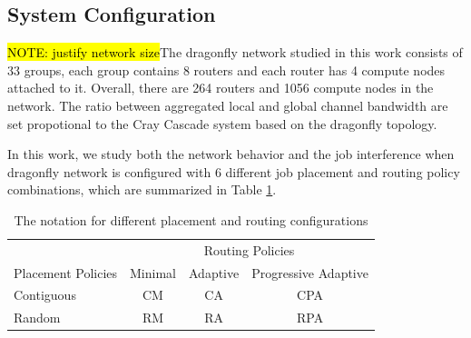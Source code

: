 \documentclass[conference,compsoc]{IEEEtran}
\newcommand{\NOTE}[1]{\hl {NOTE: #1}}
\begin{document}
\subsection{System Configuration}
\label{sec: simulation configuration}

\NOTE{justify network size}The dragonfly network studied in this work consists of 33 groups, each group contains 8 routers and each router has 4 compute nodes attached to it. Overall, there are 264 routers and 1056 compute nodes in the network. The ratio between aggregated local and global channel bandwidth are set propotional to the Cray Cascade system\cite{faanes} based on the dragonfly topology\cite{dally-dragonfly}.

In this work, we study both the network behavior and the job interference when dragonfly network is configured with 6 different job placement and routing policy combinations, which are summarized in Table \ref{tab: placement routing configs}. 

\begin{table}[ht]
\begin{center}
\caption{The notation for different placement and routing configurations} 
\label{tab: placement routing configs}
\begin{tabular}{l c c c }
\toprule %
\toprule
&\multicolumn{3}{c}{Routing Policies} \\ %
\cmidrule(l){2-4}
Placement Policies & Minimal & Adaptive & Progressive Adaptive\\ %
\midrule %
Contiguous  &  CM   &   CA   &  CPA   \\ %
\midrule
Random  &   RM  &   RA   &  RPA   \\ 
\midrule %
\bottomrule %
\end{tabular}
\end{center}
\end{table}
\end{document}

